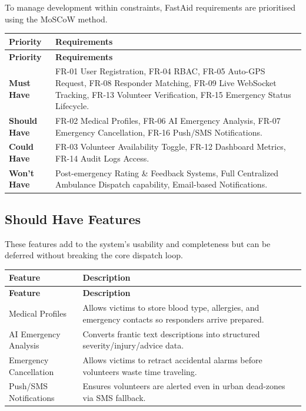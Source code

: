 \documentclass[12pt,a4paper]{article}
\begin{document}
To manage development within constraints, FastAid requirements are prioritised using the MoSCoW method.

\begin{longtable}{|p{3cm}|p{10cm}|}
\hline
\rowcolor{lightorange}
\textbf{Priority} & \textbf{Requirements} \\
\hline
\endfirsthead
\hline
\rowcolor{lightorange}
\textbf{Priority} & \textbf{Requirements} \\
\hline
\endhead

\textbf{Must Have} &
FR-01 User Registration, FR-04 RBAC, FR-05 Auto-GPS Request, FR-08 Responder Matching, FR-09 Live WebSocket Tracking, FR-13 Volunteer Verification, FR-15 Emergency Status Lifecycle. \\
\hline

\textbf{Should Have} &
FR-02 Medical Profiles, FR-06 AI Emergency Analysis, FR-07 Emergency Cancellation, FR-16 Push/SMS Notifications. \\
\hline

\textbf{Could Have} &
FR-03 Volunteer Availability Toggle, FR-12 Dashboard Metrics, FR-14 Audit Logs Access. \\
\hline

\textbf{Won't Have} &
Post-emergency Rating \& Feedback Systems, Full Centralized Ambulance Dispatch capability, Email-based Notifications. \\
\hline

\end{longtable}

\subsection{Should Have Features}
These features add to the system's usability and completeness but can be deferred without breaking the core dispatch loop.

\begin{longtable}{|p{4cm}|p{9cm}|}
\hline
\rowcolor{lightorange}
\textbf{Feature} & \textbf{Description} \\
\hline
\endfirsthead
\hline
\rowcolor{lightorange}
\textbf{Feature} & \textbf{Description} \\
\hline
\endhead

Medical Profiles &
Allows victims to store blood type, allergies, and emergency contacts so responders arrive prepared. \\
\hline

AI Emergency Analysis &
Converts frantic text descriptions into structured severity/injury/advice data. \\
\hline

Emergency Cancellation &
Allows victims to retract accidental alarms before volunteers waste time traveling. \\
\hline

Push/SMS Notifications &
Ensures volunteers are alerted even in urban dead-zones via SMS fallback. \\
\hline

\end{longtable}
\end{document}
